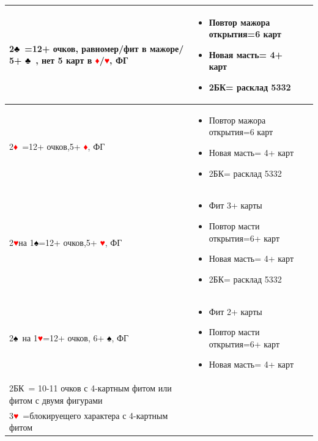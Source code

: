 \documentclass[a4paper,10pt]{article}
\newcommand{\clb}{\textcolor{black}{♣}}
\newcommand{\dia}{\textcolor{red}{♦}}
\newcommand{\hrt}{\textcolor{red}{♥}}
\newcommand{\spd}{\textcolor{black}{♠}}
\newcommand{\NT}{БК}
\begin{document}
\begin{tabularx}{\textwidth}{|X|X|X|}
2\clb\ =12+ очков, равномер/фит в мажоре/ 5+ \clb\ , нет 5 карт в \dia/\hrt , ФГ &
\begin{itemize}[label=\textcolor{sputnikRed}{\tiny\(\blacksquare\)}, leftmargin=*, nosep]
    \item Повтор мажора открытия=6 карт
    \item Новая масть= 4+ карт
    \item 2\NT = расклад 5332
\end{itemize}
& \\ \hline
2\dia\ =12+ очков,5+ \dia, ФГ & 
\begin{itemize}[label=\textcolor{sputnikRed}{\tiny\(\blacksquare\)}, leftmargin=*, nosep]
    \item Повтор мажора открытия=6 карт
    \item Новая масть= 4+ карт
    \item 2\NT = расклад 5332
\end{itemize}
& \\ \hline
2\hrt на 1\spd =12+ очков,5+ \hrt , ФГ & 
\begin{itemize}[label=\textcolor{sputnikRed}{\tiny\(\blacksquare\)}, leftmargin=*, nosep]
    \item Фит 3+ карты
    \item Повтор масти открытия=6+ карт
    \item Новая масть= 4+ карт
    \item 2\NT = расклад 5332
\end{itemize} & \\ \hline
2\spd\ на 1\hrt =12+ очков, 6+ \spd , ФГ & 
\begin{itemize}[label=\textcolor{sputnikRed}{\tiny\(\blacksquare\)}, leftmargin=*, nosep]
    \item Фит 2+ карты
    \item Повтор масти открытия=6+ карт
    \item Новая масть= 4+ карт
\end{itemize}& \\ \hline
2\NT\ = 10-11 очков с 4-картным фитом или фитом с двумя фигурами &  & \\ \hline
3\hrt\ =блокируещего характера с 4-картным фитом &  & \\ \hline
\end{tabularx}
\end{document}
